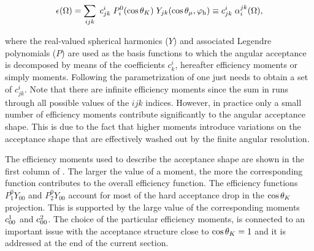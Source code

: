 \begin{equation}
  \centering
  \epsilon(\Omega) = \sum_{ijk} \; \moment{i}{j}{k} \; P_i^0(\cos\thetaK) \; Y_{jk}(\cos\thetamu,\phihel) \equiv \moment{i}{j}{k} \; \effbase,
  \label{eff_func}
\end{equation}

\noindent where the real-valued spherical harmonics ($Y$) and associated Legendre polynomials ($P$) are used as the basis
functions to which the angular acceptance is decomposed by means of the coefficients $c^i_{k}$, hereafter efficiency moments or simply moments.
Following the parametrization of  one just needs to obtain a set of $c^i_{jk}$. Note that there are \aprior infinite efficiency moments
since the sum in  runs through all possible values of the $ijk$ indices. However, in practice only a small number of efficiency moments
contribute significantly to the angular acceptance shape. This is due to the fact that higher moments introduce
variations on the acceptance shape that are effectively washed out by the finite angular resolution.

The efficiency moments used to describe the acceptance shape are shown in the first column of .
The larger the value of a moment, the more the corresponding function contributes to the overall efficiency function.
The efficiency functions $P_1^0Y_{00}$ and $P_2^0Y_{00}$ account for most of the hard acceptance drop in the $\cos\theta_{K}$ projection.
This is supported by the large value of the corresponding moments $c^{1}_{00}$ and $c^{2}_{00}$.
The choice of the particular efficiency moments, is connected to an important
issue with the acceptance structure close to $\cos\theta_{K}=1$ and it is addressed at the end of the current section.

